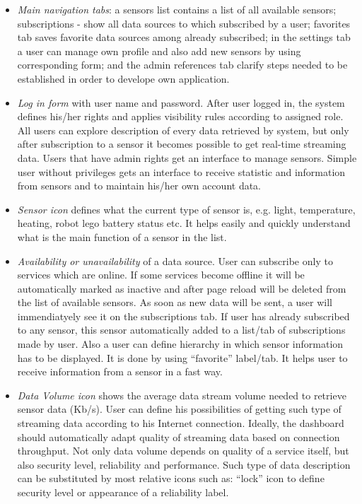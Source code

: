       \begin{itemize}
      \item \emph{Main navigation tabs}: a sensors list contains a list of all available sensors; subscriptions - show all data sources to which subscribed by a user; favorites tab saves favorite data sources among already subscribed; in the settings tab a user can manage own profile and also add new sensors by using corresponding form; and the admin references tab clarify steps needed to be established in order to develope own application.
      \item \emph{Log in form} with user name and password. After user logged in, the system defines his/her rights and applies visibility rules according to assigned role. All users can explore description of every data retrieved by system, but only after subscription to a sensor it becomes possible to get real-time streaming data. Users that have admin rights get an interface to manage sensors. Simple user without privileges gets an interface to receive statistic and information from sensors and to maintain his/her own account data.
      \item \emph{Sensor icon} defines what the current type of sensor is, e.g. light, temperature, heating, robot lego battery status etc. It helps easily and quickly understand what is the main function of a sensor in the list.
      \item \emph{Availability or unavailability} of a data source. User can subscribe only to services which are online. If some services become offline it will be automatically marked as inactive and after page reload will be deleted from the list of available sensors. As soon as new data will be sent, a user will immendiatyely see it on the subscriptions tab. If user has already subscribed to any sensor, this sensor automatically added to a list/tab of subscriptions made by user. Also a user can define hierarchy in which sensor information has to be displayed. It is done by using ``favorite'' label/tab. It helps user to receive information from a sensor in a fast way.
      \item \emph{Data Volume icon} shows the average data stream volume needed to retrieve sensor data (Kb/s). User can define his possibilities of getting such type of streaming data according to his Internet connection. Ideally, the dashboard should automatically adapt quality of streaming data based on connection throughput. Not only data volume depends on quality of a service itself, but also security level, reliability and performance. Such type of data description can be substituted by most relative icons such as: ``lock'' icon to define security level or appearance of a reliability label.

\end{itemize}
